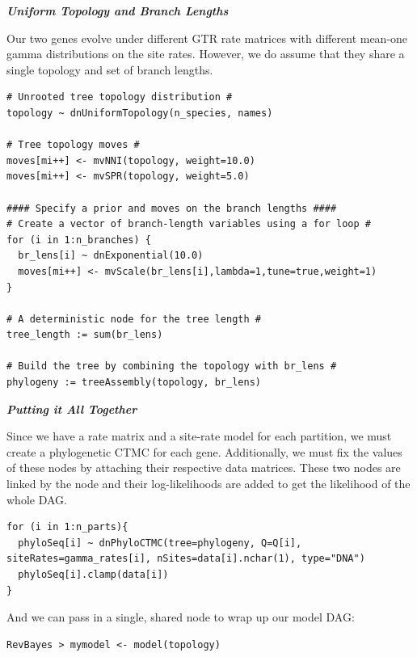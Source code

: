 \textbf{\textit{Uniform Topology and Branch Lengths}}

Our two genes evolve under different GTR rate matrices with different mean-one gamma distributions on the site rates.
However, we do assume that they share a single topology and set of branch lengths.
{\tt \begin{snugshade*}
\begin{lstlisting}
# Unrooted tree topology distribution #
topology ~ dnUniformTopology(n_species, names)

# Tree topology moves #
moves[mi++] <- mvNNI(topology, weight=10.0)
moves[mi++] <- mvSPR(topology, weight=5.0)

#### Specify a prior and moves on the branch lengths #### 
# Create a vector of branch-length variables using a for loop #
for (i in 1:n_branches) {
  br_lens[i] ~ dnExponential(10.0)
  moves[mi++] <- mvScale(br_lens[i],lambda=1,tune=true,weight=1) 
}

# A deterministic node for the tree length #
tree_length := sum(br_lens)

# Build the tree by combining the topology with br_lens #
phylogeny := treeAssembly(topology, br_lens)
\end{lstlisting}
\end{snugshade*}}

\textbf{\textit{Putting it All Together}}

Since we have a rate matrix and a site-rate model for each partition, we must create a phylogenetic CTMC for each gene. 
Additionally, we must fix the values of these nodes by attaching their respective data matrices.
These two nodes are linked by the  node and their log-likelihoods are added to get the likelihood of the whole DAG.
{\tt \begin{snugshade*}
\begin{lstlisting}
for (i in 1:n_parts){
  phyloSeq[i] ~ dnPhyloCTMC(tree=phylogeny, Q=Q[i], siteRates=gamma_rates[i], nSites=data[i].nchar(1), type="DNA")
  phyloSeq[i].clamp(data[i])
}
\end{lstlisting}
\end{snugshade*}}


And we can pass in a single, shared node to wrap up our model DAG:
{\tt \begin{snugshade*}
\begin{lstlisting}
RevBayes > mymodel <- model(topology)
\end{lstlisting}
\end{snugshade*}}


